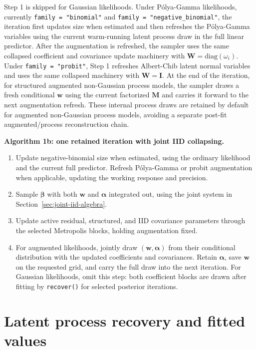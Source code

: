 \documentclass[11pt]{article}
\newcommand{\bw}{\bm{w}}
\newcommand{\balpha}{\bm{\alpha}}
\newcommand{\bbeta}{\bm{\beta}}
\newcommand{\bI}{\bm{I}}
\newcommand{\bM}{\bm{M}}
\newcommand{\bW}{\bm{W}}
\begin{document}
Step 1 is skipped for Gaussian likelihoods. Under P{\'o}lya-Gamma likelihoods, currently \texttt{family = "binomial"} and \texttt{family = "negative\_binomial"}, the iteration first updates size when estimated and then refreshes the P{\'o}lya-Gamma variables using the current warm-running latent process draw in the full linear predictor. After the augmentation is refreshed, the sampler uses the same collapsed coefficient and covariance update machinery with $\bW=\mathrm{diag}(\omega_i)$. Under \texttt{family = "probit"}, Step 1 refreshes Albert-Chib latent normal variables and uses the same collapsed machinery with $\bW=\bI$. At the end of the iteration, for structured augmented non-Gaussian process models, the sampler draws a fresh conditional $\bw$ using the current factorized $\bM$ and carries it forward to the next augmentation refresh. These internal process draws are retained by default for augmented non-Gaussian process models, avoiding a separate post-fit augmented/process reconstruction chain.

\begin{center}
\begin{minipage}{0.95\textwidth}
\textbf{Algorithm 1b: one retained iteration with joint IID collapsing.}
\begin{enumerate}
\item Update negative-binomial size when estimated, using the ordinary likelihood
and the current full predictor. Refresh P{\'o}lya-Gamma or probit augmentation
when applicable, updating the working response and precision.
\item Sample $\bbeta$ with both $\bw$ and $\balpha$ integrated out, using the
joint system in Section~\ref{sec:joint-iid-algebra}.
\item Update active residual, structured, and IID covariance parameters through
the selected Metropolis blocks, holding augmentation fixed.
\item For augmented likelihoods, jointly draw $(\bw,\balpha)$ from their conditional
distribution with the updated coefficients and covariances. Retain $\balpha$,
save $\bw$ on the requested grid, and carry the full draw into the next iteration.
For Gaussian likelihoods, omit this step: both coefficient blocks are drawn
after fitting by \texttt{recover()} for selected posterior iterations.
\end{enumerate}
\end{minipage}
\end{center}

\section{Latent process recovery and fitted values}
\end{document}

